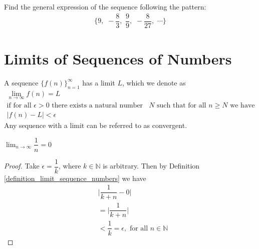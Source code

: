 \begin{exercise}
Find the general expression of the sequence following the pattern:
\begin{align*}
    \Big\{9, \hspace{4pt} -\dfrac{8}{3}, \hspace{4pt} \dfrac{9}{9}, \hspace{4pt} -\dfrac{8}{27}, \hspace{4pt} \cdots \Big\}
\end{align*}
\end{exercise}

\newpage
\section{Limits of Sequences of Numbers}\label{limits_of_sequences_of_numbers}

\begin{definition}
A sequence $\{f(n)\}_{n=1}^{\infty}$ has a limit $L$, which we denote as 
\begin{align*}
    \lim_{n \longrightarrow \infty} f(n) = L\\[2ex]
    \text{if for all} \hspace{4pt} \epsilon > 0 \hspace{4pt} \text{there exists a natural number} \hspace{4pt} &N \hspace{4pt} \text{such that for all} \hspace{4pt} n \geq N \hspace{4pt} \text{we have}\\[2ex]
    \lvert f(n) - L \rvert < \epsilon
\end{align*}
Any sequence with a limit can be referred to as convergent.
\label{definition_limit_sequence_numbers}
\end{definition}

\begin{example}
$\lim_{n \longrightarrow \infty} \dfrac{1}{n} = 0$
\begin{proof}
Take $\epsilon = \dfrac{1}{k}$, where $k \in \mathbb{N}$ is arbitrary. Then by Definition \ref{definition_limit_sequence_numbers} we have
\begin{align*}
    &\Big\lvert \dfrac{1}{k+n} - 0 \Big\rvert\\[2ex]
    &= \Big\lvert \dfrac{1}{k+n} \Big\rvert\\[2ex]
    &< \dfrac{1}{k} = \epsilon, \hspace{4pt} \text{for all} \hspace{4pt} n \in \mathbb{N}
\end{align*}
\end{proof}
\label{limit_one_over_n}
\end{example}

